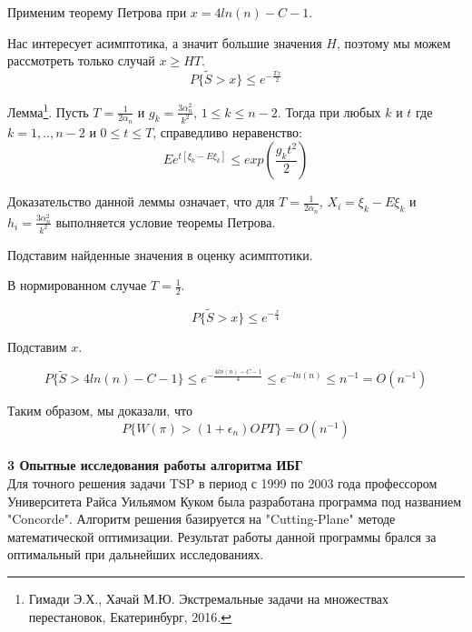 \documentclass[a4paper, 14pt]{extarticle}
\begin{document}
Применим теорему Петрова при $x = 4ln(n) - C - 1 $.

Нас интересует асимптотика, а значит большие значения $H$, поэтому мы можем рассмотреть только случай $x \geq HT$.
\begin{equation}
P\{\tilde{S} >x \} \leq e^{-\frac{Tx}{2}}
\end{equation}

Лемма\footnote{ Гимади Э.Х., Хачай М.Ю. Экстремальные задачи на множествах перестановок, Екатеринбург, 2016.}. Пусть $T = \frac{1}{2\alpha_n}$ и $g_k = \frac{3\alpha_n^2}{k^2}$, $1 \leq k \leq n-2$. Тогда при любых $k$ и $t$ где $k=1,..,n-2$ и $0 \leq t \leq T$, справедливо неравенство:
\begin{equation}
Ee^{t[\xi_k-E\xi_k]} \leq exp(\frac{g_k t^2}{2})
\end{equation}


Доказательство данной леммы означает, что для $T = \frac{1}{2\alpha_n}$, $X_i = \xi_k-E\xi_k$ и $h_i = \frac{3\alpha_n^2}{k^2}$ выполняется условие теоремы Петрова.

Подставим найденные значения в оценку асимптотики.

В нормированном случае $T = \frac{1}{2}$.

\begin{equation}
P\{\tilde{S} >x \} \leq e^{-\frac{x}{4}}
\end{equation}

Подставим $x$.

\begin{equation}
P\{\tilde{S} >4ln(n) - C - 1 \} \leq e^{-\frac{4ln(n) - C - 1}{4}} \leq e^{-ln(n)} \leq n^{-1} = O(n^{-1})
\end{equation}

Таким образом, мы доказали, что
\begin{equation}
P\{ W(\pi)>(1+\epsilon_n)OPT \} = O(n^{-1})
\end{equation}\\



\textbf{3 Опытные исследования работы алгоритма ИБГ}\\


Для точного решения задачи TSP в период с 1999 по 2003 года профессором Университета Райса Уильямом Куком была разработана программа под названием "Concorde". Алгоритм решения базируется на "Cutting-Plane" методе математической оптимизации. Результат работы данной программы брался за оптимальный при дальнейших исследованиях.
\end{document}
